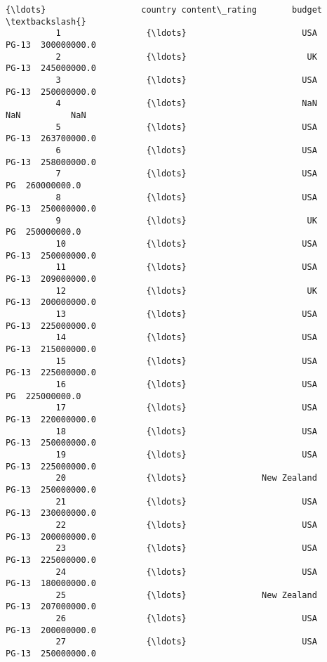 \documentclass[11pt]{article}
\begin{document}
\begin{Verbatim}[commandchars=\\\{\}]
                            {\ldots}                   country content\_rating       budget  \textbackslash{}
          1                 {\ldots}                       USA          PG-13  300000000.0   
          2                 {\ldots}                        UK          PG-13  245000000.0   
          3                 {\ldots}                       USA          PG-13  250000000.0   
          4                 {\ldots}                       NaN            NaN          NaN   
          5                 {\ldots}                       USA          PG-13  263700000.0   
          6                 {\ldots}                       USA          PG-13  258000000.0   
          7                 {\ldots}                       USA             PG  260000000.0   
          8                 {\ldots}                       USA          PG-13  250000000.0   
          9                 {\ldots}                        UK             PG  250000000.0   
          10                {\ldots}                       USA          PG-13  250000000.0   
          11                {\ldots}                       USA          PG-13  209000000.0   
          12                {\ldots}                        UK          PG-13  200000000.0   
          13                {\ldots}                       USA          PG-13  225000000.0   
          14                {\ldots}                       USA          PG-13  215000000.0   
          15                {\ldots}                       USA          PG-13  225000000.0   
          16                {\ldots}                       USA             PG  225000000.0   
          17                {\ldots}                       USA          PG-13  220000000.0   
          18                {\ldots}                       USA          PG-13  250000000.0   
          19                {\ldots}                       USA          PG-13  225000000.0   
          20                {\ldots}               New Zealand          PG-13  250000000.0   
          21                {\ldots}                       USA          PG-13  230000000.0   
          22                {\ldots}                       USA          PG-13  200000000.0   
          23                {\ldots}                       USA          PG-13  225000000.0   
          24                {\ldots}                       USA          PG-13  180000000.0   
          25                {\ldots}               New Zealand          PG-13  207000000.0   
          26                {\ldots}                       USA          PG-13  200000000.0   
          27                {\ldots}                       USA          PG-13  250000000.0   

\end{Verbatim}
\end{document}
